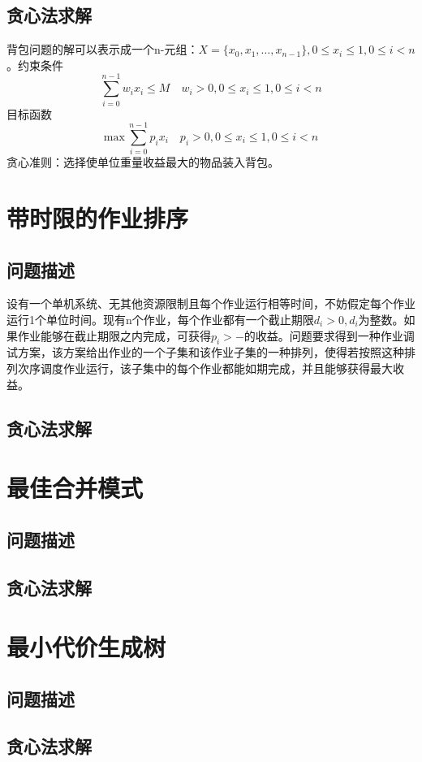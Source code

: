 \subsection*{贪心法求解}
背包问题的解可以表示成一个n-元组：$X=\{x_0,x_1,\dots,x_{n-1}\},0\leq x_i\leq 1,0\leq i<n$。约束条件
\begin{equation}
	\sum_{i=0}^{n-1}w_ix_i\leq M\quad w_i>0,0\leq x_i\leq 1,0\leq i<n
\end{equation}
目标函数
\begin{equation}
	\mathrm{max}\ \sum_{i=0}^{n-1}p_ix_i\quad p_i>0,0\leq x_i\leq 1,0\leq i<n
\end{equation}
贪心准则：选择使单位重量收益最大的物品装入背包。
\section{带时限的作业排序}
\subsection*{问题描述}
设有一个单机系统、无其他资源限制且每个作业运行相等时间，不妨假定每个作业运行1个单位时间。现有n个作业，每个作业都有一个截止期限$d_i>0,d_i$为整数。如果作业能够在截止期限之内完成，可获得$p_i>-$的收益。问题要求得到一种作业调试方案，该方案给出作业的一个子集和该作业子集的一种排列，使得若按照这种排列次序调度作业运行，该子集中的每个作业都能如期完成，并且能够获得最大收益。
\subsection*{贪心法求解}
\section{最佳合并模式}
\subsection*{问题描述}
\subsection*{贪心法求解}
\section{最小代价生成树}
\subsection*{问题描述}
\subsection*{贪心法求解}
